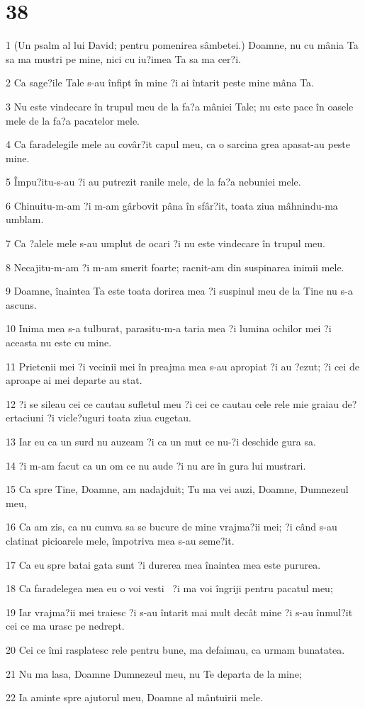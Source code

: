 \chapter{38}

\par 1 (Un psalm al lui David; pentru pomenirea sâmbetei.) Doamne, nu cu mânia Ta sa ma mustri pe mine, nici cu iu?imea Ta sa ma cer?i.
\par 2 Ca sage?ile Tale s-au înfipt în mine ?i ai întarit peste mine mâna Ta.
\par 3 Nu este vindecare în trupul meu de la fa?a mâniei Tale; nu este pace în oasele mele de la fa?a pacatelor mele.
\par 4 Ca faradelegile mele au covâr?it capul meu, ca o sarcina grea apasat-au peste mine.
\par 5 Împu?itu-s-au ?i au putrezit ranile mele, de la fa?a nebuniei mele.
\par 6 Chinuitu-m-am ?i m-am gârbovit pâna în sfâr?it, toata ziua mâhnindu-ma umblam.
\par 7 Ca ?alele mele s-au umplut de ocari ?i nu este vindecare în trupul meu.
\par 8 Necajitu-m-am ?i m-am smerit foarte; racnit-am din suspinarea inimii mele.
\par 9 Doamne, înaintea Ta este toata dorirea mea ?i suspinul meu de la Tine nu s-a ascuns.
\par 10 Inima mea s-a tulburat, parasitu-m-a taria mea ?i lumina ochilor mei ?i aceasta nu este cu mine.
\par 11 Prietenii mei ?i vecinii mei în preajma mea s-au apropiat ?i au ?ezut; ?i cei de aproape ai mei departe au stat.
\par 12 ?i se sileau cei ce cautau sufletul meu ?i cei ce cautau cele rele mie graiau de?ertaciuni ?i vicle?uguri toata ziua cugetau.
\par 13 Iar eu ca un surd nu auzeam ?i ca un mut ce nu-?i deschide gura sa.
\par 14 ?i m-am facut ca un om ce nu aude ?i nu are în gura lui mustrari.
\par 15 Ca spre Tine, Doamne, am nadajduit; Tu ma vei auzi, Doamne, Dumnezeul meu,
\par 16 Ca am zis, ca nu cumva sa se bucure de mine vrajma?ii mei; ?i când s-au clatinat picioarele mele, împotriva mea s-au seme?it.
\par 17 Ca eu spre batai gata sunt ?i durerea mea înaintea mea este pururea.
\par 18 Ca faradelegea mea eu o voi vesti  ?i ma voi îngriji pentru pacatul meu;
\par 19 Iar vrajma?ii mei traiesc ?i s-au întarit mai mult decât mine ?i s-au înmul?it cei ce ma urasc pe nedrept.
\par 20 Cei ce îmi rasplatesc rele pentru bune, ma defaimau, ca urmam bunatatea.
\par 21 Nu ma lasa, Doamne Dumnezeul meu, nu Te departa de la mine;
\par 22 Ia aminte spre ajutorul meu, Doamne al mântuirii mele.

